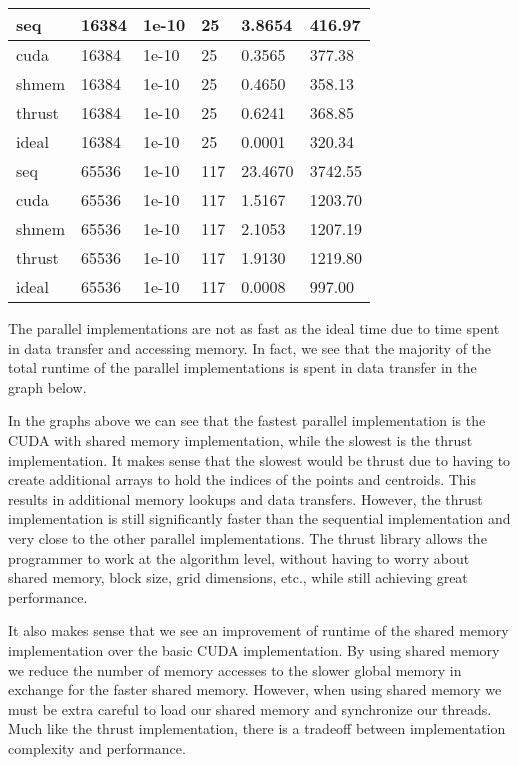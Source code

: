 \documentclass{article}
\begin{document}
\begin{center}
\begin{tabular}{|l|l|l|l|l|l|}
seq &    16384 &      1e-10 &    25 &    3.8654 &  416.97 \\ \hline
cuda &   16384 &      1e-10 &    25 &    0.3565 &  377.38 \\ \hline
shmem &  16384 &      1e-10 &    25 &    0.4650 &  358.13 \\ \hline
thrust & 16384 &      1e-10 &    25 &    0.6241 &  368.85 \\ \hline
ideal &  16384 &      1e-10 &    25 &    0.0001 &  320.34 \\ \hline

seq &    65536 &      1e-10 &   117 &   23.4670 & 3742.55 \\ \hline
cuda &   65536 &      1e-10 &   117 &    1.5167 & 1203.70 \\ \hline
shmem &  65536 &      1e-10 &   117 &    2.1053 & 1207.19 \\ \hline
thrust & 65536 &      1e-10 &   117 &    1.9130 & 1219.80 \\ \hline
ideal &  65536 &      1e-10 &   117 &    0.0008 &  997.00 \\ \hline
\end{tabular}
\end{center}

The parallel implementations are not as fast as the ideal time due to time
spent in data transfer and accessing memory.
In fact, we see that the majority of the total runtime of the parallel
implementations is spent in data transfer in the graph below.


\begin{center}
  
\end{center}

In the graphs above we can see that the fastest parallel implementation is the
CUDA with shared memory implementation, while the slowest is the thrust
implementation.
It makes sense that the slowest would be thrust due to having to create
additional arrays to hold the indices of the points and centroids.
This results in additional memory lookups and data transfers.
However, the thrust implementation is still significantly faster than the
sequential implementation and very close to the other parallel implementations.
The thrust library allows the programmer to work at the algorithm level,
without having to worry about shared memory, block size, grid dimensions, etc.,
while still achieving great performance.

It also makes sense that we see an improvement of runtime of the shared memory
implementation over the basic CUDA implementation.
By using shared memory we reduce the number of memory accesses to the slower
global memory in exchange for the faster shared memory.
However, when using shared memory we must be extra careful to load our shared
memory and synchronize our threads.
Much like the thrust implementation, there is a tradeoff between implementation
complexity and performance.
\end{document}
